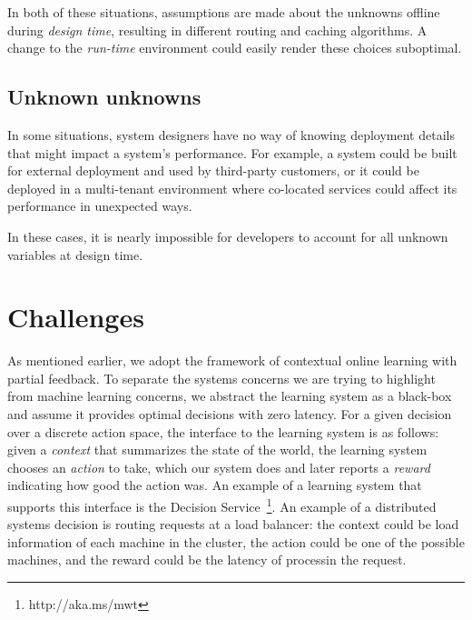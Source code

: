 \documentclass[a4paper,twocolumn]{article}
\newcommand{\ignore}[1]{}
\begin{document}
In both of these situations, assumptions are made about the unknowns offline during
\emph{design time}, resulting in different routing and caching algorithms. A change to
the \emph{run-time} environment could easily render these choices suboptimal.

\ignore{
Online learning has the potential to make these decisions online, based on current contexts,
and can be nimble in adapting to any changes to the run-time
environment.
}

\subsection*{Unknown unknowns}

In some situations, system designers have no way of knowing deployment details
that might impact a system's performance. For example, a system could be
built for external deployment and used by third-party customers, or it could be
deployed in a multi-tenant environment where co-located services could
affect its performance in unexpected ways. 

In these cases, it is nearly impossible for developers to account for all 
unknown variables at design time. 

\ignore{
However, an ML agent is able to make
decisions online based on inputs from the run-time environment.
}
\ignore{
To be clear, ML has been used in some distributed systems. However, it has not
been used in a general way to make online decisions about core distributed
systems implementation details. We advocate that developers should focus on
high-level objectives of their system, and use online ML to make to compute the
specifics (such as policies for request routing, replica placement, or failure
monitoring) at run-time based on observed metrics.
}

\section{Challenges}

As mentioned earlier, we adopt the framework of contextual online learning
with partial feedback.  To separate the systems concerns we are trying to
highlight from machine learning concerns, we abstract the learning system as a
black-box and assume it provides optimal decisions with zero latency. For a
given decision over a discrete action space, the interface to the learning
system is as follows: given a {\em context} that summarizes the state of the
world, the learning system chooses an {\em action} to take, which our system
does and later reports a {\em reward} indicating how good the action was. An
example of a learning system that supports this interface is the Decision
Service~\footnote{http://aka.ms/mwt}. An example of a distributed systems
decision is routing requests at a load balancer: the context could be load
information of each machine in the cluster, the action could be one of the
possible machines, and the reward could be the latency of processin the request.
\end{document}

